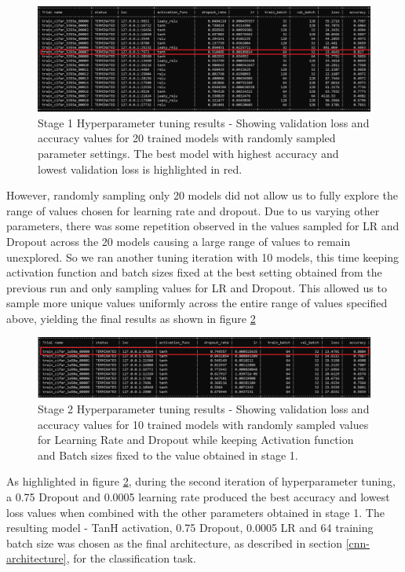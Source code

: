 \documentclass{l4proj}
\begin{document}
\begin{figure}[h]
    \centering
    \includegraphics[scale=0.4]{images/tuning-stage1.png}
    \caption{Stage 1 Hyperparameter tuning results - Showing validation loss and accuracy values for 20 trained models with randomly sampled parameter settings. The best model with highest accuracy and lowest validation loss is highlighted in red. }
    \label{fig:tuning-stage-1}
\end{figure}

However, randomly sampling only 20 models did not allow us to fully explore the range of values chosen for learning rate and dropout. Due to us varying other parameters, there was some repetition observed in the values sampled for LR and Dropout across the 20 models causing a large range of values to remain unexplored. So we ran another tuning iteration with 10 models, this time keeping activation function and batch sizes fixed at the best setting obtained from the previous run and only sampling values for LR and Dropout. This allowed us to sample more unique values uniformly across the entire range of values specified above, yielding the final results as shown in figure \ref{fig:tuning-stage-2}

\begin{figure}[h]
    \centering
    \includegraphics[scale=0.4]{images/tuning-stage2.png}
    \caption{Stage 2 Hyperparameter tuning results - Showing validation loss and accuracy values for 10 trained models with randomly sampled values for Learning Rate and Dropout while keeping Activation function and Batch sizes fixed to the value obtained in stage 1. }
    \label{fig:tuning-stage-2}
\end{figure}

As highlighted in figure \ref{fig:tuning-stage-2}, during the second iteration of hyperparameter tuning, a 0.75 Dropout and 0.0005 learning rate produced the best accuracy and lowest loss values when combined with the other parameters obtained in stage 1. The resulting model - TanH activation, 0.75 Dropout, 0.0005 LR and 64 training batch size was chosen as the final architecture, as described in section \ref{cnn-architecture}, for the classification task.
\end{document}

